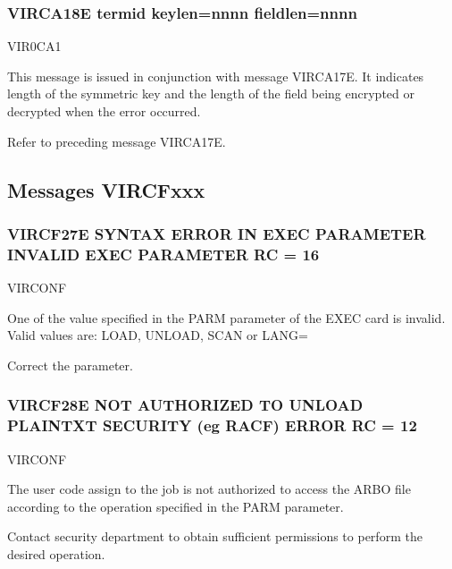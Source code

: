 \documentclass[letterpaper,10pt,english]{sphinxmanual}
\begin{document}
\subsubsection{VIRCA18E termid keylen=nnnn fieldlen=nnnn}
\label{\detokenize{messages:virca18e-termid-keylen-nnnn-fieldlen-nnnn}}\begin{description}
\sphinxAtStartPar
VIR0CA1

\sphinxAtStartPar
This message is issued in conjunction with message VIRCA17E. It indicates length of the symmetric key and the length of the field being encrypted or decrypted when the error occurred.

\sphinxAtStartPar
Refer to preceding message VIRCA17E.

\end{description}


\subsection{Messages VIRCFxxx}
\label{\detokenize{messages:messages-vircfxxx}}

\subsubsection{VIRCF27E SYNTAX ERROR IN EXEC PARAMETER INVALID EXEC PARAMETER \sphinxhyphen{} RC = 16}
\label{\detokenize{messages:vircf27e-syntax-error-in-exec-parameter-invalid-exec-parameter-rc-16}}\begin{description}
\sphinxAtStartPar
VIRCONF

\sphinxAtStartPar
One of the value specified in the PARM parameter of the EXEC card is invalid. Valid values are: LOAD, UNLOAD, SCAN or LANG=

\sphinxAtStartPar
Correct the parameter.

\end{description}


\subsubsection{VIRCF28E NOT AUTHORIZED TO UNLOAD PLAINTXT SECURITY (eg RACF) ERROR \sphinxhyphen{} RC = 12}
\label{\detokenize{messages:vircf28e-not-authorized-to-unload-plaintxt-security-eg-racf-error-rc-12}}\begin{description}
\sphinxAtStartPar
VIRCONF

\sphinxAtStartPar
The user code assign to the job is not authorized to access the ARBO file according to the operation specified in the PARM parameter.

\sphinxAtStartPar
Contact security department to obtain sufficient permissions to perform the desired operation.

\end{description}
\end{document}
